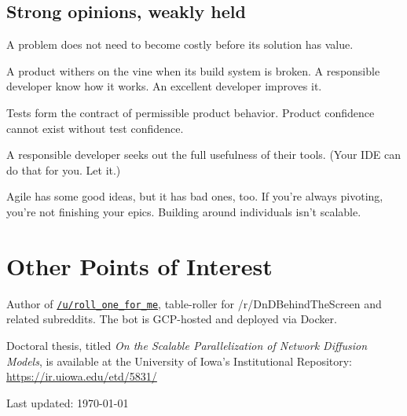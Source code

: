 \documentclass[10pt,letterpaper]{article}
\newcommand\ttt\texttt
\renewenvironment{itemize}{
  \begin{list}{}{
    \setlength{\leftmargin}{1.5em}
    \setlength{\itemsep}{0.25em}
    \setlength{\parskip}{0pt}
    \setlength{\parsep}{0.25em}
  }
}{
  \end{list}
}
\begin{document}
\subsection*{Strong opinions, {weakly} held}
\begin{itemize}
  \item A problem does not need to become costly before its solution has value.
  \item A product withers on the vine when its build system is broken.  A responsible developer know how it works.  An excellent developer improves it.
  \item Tests form the contract of permissible product behavior.  Product confidence cannot exist without test confidence.
  \item A responsible developer seeks out the full usefulness of their tools.  (Your IDE can do that for you.  Let it.)
  \item Agile has some good ideas, but it has bad ones, too.  If you're always pivoting, you're not finishing your epics.  Building around individuals isn't scalable.
\end{itemize}


\section*{Other Points of Interest}
\begin{itemize}
\item Author of \href{https://www.reddit.com/user/roll_one_for_me}{
  \ttt{/u/roll\_one\_for\_me}}, table-roller for /r/DnDBehindTheScreen and
  related subreddits.  The bot is GCP-hosted and deployed via Docker.
\item Doctoral thesis, titled {\em On the Scalable Parallelization of Network Diffusion Models}, is available
  at the University of Iowa's Institutional Repository:  \url{https://ir.uiowa.edu/etd/5831/}
\end{itemize}

\vfill
\begin{center}
  \begin{small}
    Last updated: \today
  \end{small}
\end{center}
\end{document}
